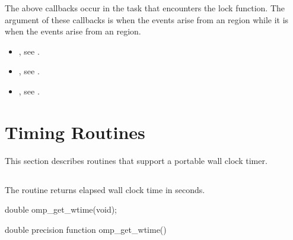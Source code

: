The above callbacks occur in the task that encounters the lock function.  
The  argument of these callbacks is  when
the events arise from an  region while it is 
 when the events arise from an 
 region.

\crossreferences
\begin{itemize}
\item {}, see
.

\item {}, see
.

\item {}, see
.
\end{itemize}



\section{Timing Routines}
\label{sec:Timing Routines}
This section describes routines that support a portable wall clock timer.











\subsection{}
\label{subsec:omp_get_wtime}
\summary
The  routine returns elapsed wall clock time in seconds.

\format
\begin{ccppspecific}
\begin{ompcFunction}
double omp_get_wtime(void);
\end{ompcFunction}
\end{ccppspecific}

\begin{fortranspecific}
\begin{ompfFunction}
double precision function omp_get_wtime()
\end{ompfFunction}
\end{fortranspecific}


